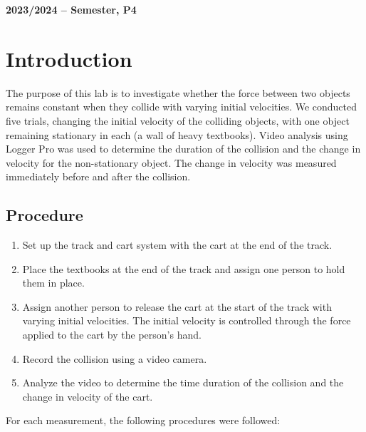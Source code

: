 \documentclass[12pt]{article}
\begin{document}
\begin{center}
    \large \bf 2023/2024 --  Semester, P4
\end{center}

\thispagestyle{empty}

\setcounter{page}{0}

\newpage

\tableofcontents

\newpage

\section{Introduction}

The purpose of this lab is to investigate whether the force between two objects remains constant when they collide with varying initial velocities. We conducted five trials, changing the initial velocity of the colliding objects, with one object remaining stationary in each (a wall of heavy textbooks). Video analysis using Logger Pro was used to determine the duration of the collision and the change in velocity for the non-stationary object. The change in velocity was measured immediately before and after the collision.

\subsection*{Procedure}

\begin{enumerate}
    \item Set up the track and cart system with the cart at the end of the track.
    \item Place the textbooks at the end of the track and assign one person to hold them in place.
    \item Assign another person to release the cart at the start of the track with varying initial velocities. The initial velocity is controlled through the force applied to the cart by the person's hand.
    \item Record the collision using a video camera.
    \item Analyze the video to determine the time duration of the collision and the change in velocity of the cart.
\end{enumerate}

For each measurement, the following procedures were followed:
\end{document}
